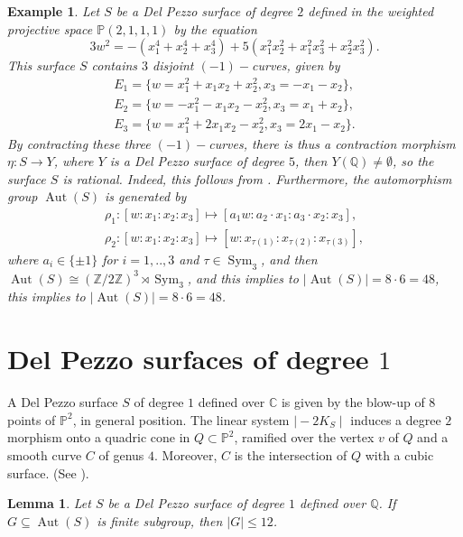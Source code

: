 \documentclass[leqno,12pt]{amsart} %
\newtheorem{lem}[thm]{Lemma}
\newtheorem{ex}[thm]{Example}
\newcommand{\Z}{\ensuremath{\mathbb{Z}}}
\newcommand{\Q}{\ensuremath{\mathbb{Q} }}
\newcommand{\C}{\ensuremath{\mathbb{C} }}
\newcommand{\p}{\ensuremath{\mathbb{P} }}
\DeclareMathOperator{\Aut}{Aut}
\DeclareMathOperator{\sym}{Sym}
\begin{document}
\begin{ex}\label{ex-08}
    Let $S$ be a Del Pezzo surface of degree $2$ defined in the weighted projective space $\p(2,1,1,1)$ by the equation
    \[3 w^{2}=-(x_1^{4}+x_2^{4}+x_3^{4})+5( x_1^{2} x_2^{2}+x_1^{2} x_3^{2}+ x_2^{2} x_3^{2}).\]
   This surface $S$ contains $3$ disjoint $(-1)-$curves, given by
  \[\begin{array}{l}
          E_1=\{w = x_1^{2}+x_1 x_2 +x_2^{2}, x_3 = -x_1 -x_2\},\\
        E_2=\{w = -x_1^{2}-x_1 x_2 -x_2^{2}, x_3 = x_1 +x_2\},\\
        E_3=\{w = x_1^{2}+2 x_1 x_2 -x_2^{2}, x_3 = 2 x_1 -x_2\}.
    \end{array}\]
By contracting these three $(-1)-$curves, there is thus a contraction morphism $\eta: S\rightarrow Y$, where $Y$ is a Del Pezzo surface of degree $5$, then $Y(\Q )\neq\emptyset$, so the surface $S$ is rational. Indeed, this follows from \cite[Theorem 3.15]{MR225780}. Furthermore, the automorphism group $\Aut(S)$ is generated by  %
 \[\begin{array}{l}
    \rho_1: [w:x_1:x_2:x_3]\mapsto[a_1w:a_2\cdot x_1:a_3\cdot x_2:x_3], \\
    \rho_2: [w:x_1:x_2:x_3]\mapsto[w:x_{\tau(1)}:x_{\tau(2)}:x_{\tau(3)}],
 \end{array}\]
where $a_i\in\{\pm1\}$ for $i=1,..,3$ and $\tau\in\sym_3$, and then $\Aut(S)\cong(\Z /2\Z )^3\rtimes\sym_3$, and this implies to $\mid \Aut(S)\mid =8\cdot6=48$, this implies to $\mid \Aut(S)\mid =8\cdot6=48$.
\end{ex}
  \section{\texorpdfstring{Del Pezzo surfaces of degree $1$}{Del Pezzo surfaces of degree 1}}
A Del Pezzo surface $S$ of degree $1$ defined over $\C $ is given by the blow-up of $8$ points of $\p^2$, in general position. The linear system $\mid -2K_S\mid $ induces a degree $2$ morphism onto a quadric cone in $Q\subset\p^2$, ramified over the vertex $v$ of $Q$ and a smooth curve $C$ of genus $4$. Moreover, $C$ is the intersection of $Q$ with a cubic surface. (See \cite{MR1802909, MR2066103, MR2641179}).

\begin{lem}\label{lemm-23}
    Let $S$ be a Del Pezzo surface of degree $1$ defined over $\Q $. If $G\subseteq\Aut(S)$ is finite subgroup, then $\mid G\mid \le 12$. 
\end{lem}
 
\end{document}
